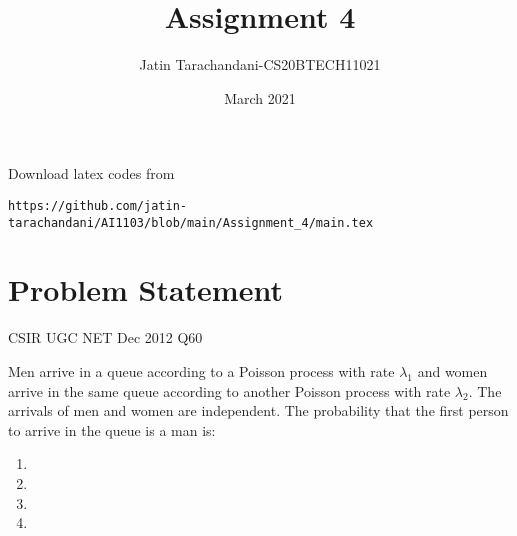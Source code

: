 \documentclass[twocolumn]{article}
\title{Assignment 4}
\author{Jatin Tarachandani-CS20BTECH11021}
\date{March 2021}
\theoremstyle{remark}
\numberwithin{equation}{subsection}
\begin{document}
\maketitle
Download latex codes from 
%
\begin{lstlisting}
https://github.com/jatin-tarachandani/AI1103/blob/main/Assignment_4/main.tex
\end{lstlisting}
\section{Problem Statement}
CSIR UGC NET Dec 2012 Q60

Men arrive in a queue according to a Poisson process with rate $\lambda_1$ and women arrive in the same queue according to another Poisson process with rate $\lambda_2$. The arrivals of men and women are independent. The probability that the first person to arrive in the queue is a man is:
\begin{enumerate}
\item {}

\item {}

\item {}

\item {} 
    
\end{enumerate}
\end{document}
